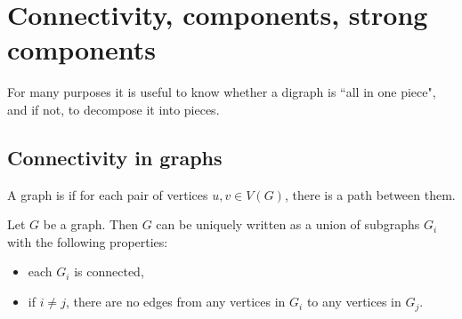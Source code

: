 \chapter{Connectivity, components, strong components} %

For many purposes it is useful to know whether a digraph is ``all in one
piece", and if not, to decompose it into pieces.

\section{Connectivity in graphs}


\begin{Definition} 
A graph is  if for each pair of 
vertices $u, v\in V(G)$, there is a path between them.
\end{Definition}



\begin{Theorem}
\label{thm:components}
Let $G$ be a graph. Then $G$ can be uniquely written as a union of
subgraphs $G_i$ with the following properties:
\begin{itemize}
\item each $G_i$ is connected,
\item if $i\neq j$, there are no edges from any vertices in $G_i$ 
to any vertices in $G_j$.
\end{itemize}
\end{Theorem}


